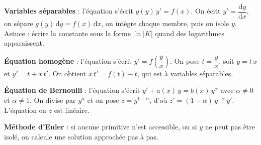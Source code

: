 \documentclass[a4paper,11pt]{article}
\newcommand{\dd}{\mathrm{d}}
\begin{document}
\begin{tcolorbox}[colback=uimmlightgray, colframe=uimmgray, boxrule=0.6pt, arc=2pt, left=8pt, right=8pt, top=4pt, bottom=4pt, title={\bfseries Méthodes pour les équations non linéaires du premier ordre}, coltitle=white, colbacktitle=uimmgray]
\small
\textbf{Variables séparables} : l'équation s'écrit $g(y)\,y' = f(x)$. On écrit $y' = \dfrac{\dd y}{\dd x}$, on sépare $g(y)\,\dd y = f(x)\,\dd x$, on intègre chaque membre, puis on isole $y$. Astuce : écrire la constante sous la forme $\ln|K|$ quand des logarithmes apparaissent.

\smallskip
\textbf{Équation homogène} : l'équation s'écrit $y' = f\!\left(\dfrac{y}{x}\right)$. On pose $t = \dfrac{y}{x}$, soit $y = t\,x$ et $y' = t + x\,t'$. On obtient $x\,t' = f(t) - t$, qui est à variables séparables.

\smallskip
\textbf{Équation de Bernoulli} : l'équation s'écrit $y' + a(x)\,y = b(x)\,y^{\alpha}$ avec $\alpha \neq 0$ et $\alpha \neq 1$. On divise par $y^{\alpha}$ et on pose $z = y^{1-\alpha}$, d'où $z' = (1-\alpha)\,y^{-\alpha}\,y'$. L'équation en $z$ est linéaire.

\smallskip
\textbf{Méthode d'Euler} : si aucune primitive n'est accessible, ou si $y$ ne peut pas être isolé, on calcule une solution approchée pas à pas.
\end{tcolorbox}
\end{document}
